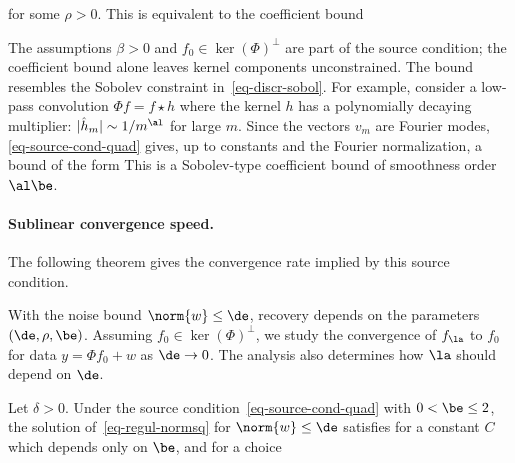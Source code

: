 for some $\rho>0$. This is equivalent to the coefficient bound


The assumptions $\beta>0$ and $f_0\in\ker(\Phi)^\bot$ are part of the source condition; the coefficient bound alone leaves kernel components unconstrained. The bound resembles the Sobolev constraint in~\ref{eq-discr-sobol}. For example, consider a low-pass convolution $\Phi f = f \star h$ where the kernel $h$ has a polynomially decaying multiplier: $|\hat h_m| \sim 1/m^{\al}$ for large $m$. Since the vectors $v_m$ are Fourier modes, \eqref{eq-source-cond-quad} gives, up to constants and the Fourier normalization, a bound of the form
This is a Sobolev-type coefficient bound of smoothness order $\al\be$.


    
\paragraph{Sublinear convergence speed.}

The following theorem gives the convergence rate implied by this source condition.
 
With the noise bound $\norm{w} \leq \de$, recovery depends on the parameters $(\de,\rho,\be)$. Assuming $f_0 \in \ker(\Phi)^\bot$, we study the convergence of $f_\la$ to $f_0$ for data $y=\Phi f_0+w$ as $\de \rightarrow 0$. The analysis also determines how $\la$ should depend on $\de$.


\begin{thm}\label{thm-sublin-quad}
	Let $\delta>0$. Under the source condition~\eqref{eq-source-cond-quad} with $0 < \be \leq 2$, the solution of~\eqref{eq-regul-normsq} for $\norm{w} \leq \de$ satisfies
	for a constant $C$ which depends only on $\be$, and
	for a choice 
\end{thm}

